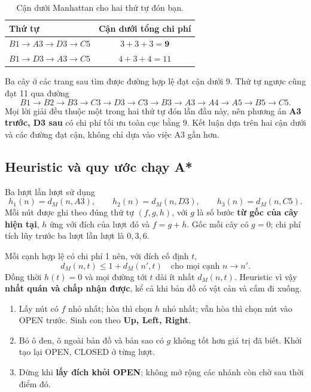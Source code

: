 \begin{table}[ht!]
    \centering
    \caption{Cận dưới Manhattan cho hai thứ tự đón bạn.}
    \renewcommand{\arraystretch}{1.2}
    \begin{tabular}{lc}
        \toprule
        \textbf{Thứ tự} & \textbf{Cận dưới tổng chi phí} \\
        \midrule
        $B1\to A3\to D3\to C5$ & $3+3+3=\mathbf{9}$ \\
        $B1\to D3\to A3\to C5$ & $4+3+4=11$ \\
        \bottomrule
    \end{tabular}
\end{table}

Ba cây ở các trang sau tìm được đường hợp lệ đạt cận dưới 9. Thứ tự ngược cũng đạt 11 qua đường
\[
 B1\to B2\to B3\to C3\to D3\to C3\to B3\to A3\to A4\to A5\to B5\to C5.
\]
Mọi lời giải đều thuộc một trong hai thứ tự đón lần đầu này, nên phương án \textbf{A3 trước, D3 sau} có chi phí tối ưu toàn cục bằng 9. Kết luận dựa trên hai cận dưới và các đường đạt cận, không chỉ dựa vào việc A3 gần hơn.

\clearpage
\subsection{Heuristic và quy ước chạy A*}

Ba lượt lần lượt sử dụng
\[
 h_1(n)=d_M(n,A3),\qquad h_2(n)=d_M(n,D3),\qquad h_3(n)=d_M(n,C5).
\]
Mỗi nút được ghi theo đúng thứ tự \textbf{$(f,g,h)$}, với $g$ là số bước \textbf{từ gốc của cây hiện tại}, $h$ ứng với đích của lượt đó và $f=g+h$. Gốc mỗi cây có $g=0$; chi phí tích lũy trước ba lượt lần lượt là $0,3,6$.

Mỗi cạnh hợp lệ có chi phí 1 nên, với đích cố định $t$,
\[
 d_M(n,t)\le 1+d_M(n',t)\quad\text{cho mọi cạnh }n\to n'.
\]
Đồng thời $h(t)=0$ và mọi đường tới $t$ dài ít nhất $d_M(n,t)$. Heuristic vì vậy \textbf{nhất quán và chấp nhận được}, kể cả khi bản đồ có vật cản và cấm đi xuống.

\begin{enumerate}
    \setlength{\itemsep}{1pt}
    \setlength{\parskip}{0pt}
    \item Lấy nút có $f$ nhỏ nhất; hòa thì chọn $h$ nhỏ nhất; vẫn hòa thì chọn nút vào OPEN trước. Sinh con theo \textbf{Up, Left, Right}.
    \item Bỏ ô đen, ô ngoài bản đồ và bản sao có $g$ không tốt hơn giá trị đã biết. Khởi tạo lại OPEN, CLOSED ở từng lượt.
    \item Dừng khi \textbf{lấy đích khỏi OPEN}; không mở rộng các nhánh còn chờ sau thời điểm đó.
\end{enumerate}

